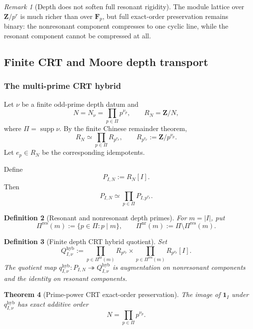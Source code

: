 \documentclass[11pt]{article}
\newtheorem{theorem}{Theorem}[section]
\newtheorem{definition}[theorem]{Definition}
\theoremstyle{remark}
\newtheorem{remark}[theorem]{Remark}
\newcommand{\Z}{\mathbf Z}
\newcommand{\F}{\mathbf F}
\begin{document}
\begin{remark}[Depth does not soften full resonant rigidity]
The module lattice over \(\Z/p^r\) is much richer than over \(\F_p\), but full exact-order preservation remains binary: the nonresonant component compresses to one cyclic line, while the resonant component cannot be compressed at all.
\end{remark}

\subsection{Finite CRT and Moore depth transport}

\subsubsection{The multi-prime CRT hybrid}

Let \(\nu\) be a finite odd-prime depth datum and
\[
 N=N_\nu=\prod_{p\in\Pi}p^{\nu_p},
 \qquad
 R_N=\Z/N,
\]
where \(\Pi=\operatorname{supp}\nu\).  By the finite Chinese remainder theorem,
\[
 \boxed{
 R_N\simeq\prod_{p\in\Pi}R_{p^{\nu_p}},
 \qquad
 R_{p^{\nu_p}}:=\Z/p^{\nu_p}.}
\]
Let \(e_p\in R_N\) be the corresponding idempotents.

Define
\[
 P_{I,N}:=R_N[I].
\]
Then
\[
 P_{I,N}\simeq\prod_{p\in\Pi}P_{I,p^{\nu_p}}.
\]

\begin{definition}[Resonant and nonresonant depth primes]
For \(m=|I|\), put
\[
 \Pi^{\mathrm{res}}(m):=\{p\in\Pi:p\mid m\},
 \qquad
 \Pi^{\mathrm{nr}}(m):=\Pi\setminus\Pi^{\mathrm{res}}(m).
\]
\end{definition}

\begin{definition}[Finite depth CRT hybrid quotient]\label{P1C-def:depth-crt-hybrid}
Set
\[
 \boxed{
 Q_{I,\nu}^{\mathrm{hyb}}
 :=
 \prod_{p\in\Pi^{\mathrm{nr}}(m)}R_{p^{\nu_p}}
 \times
 \prod_{p\in\Pi^{\mathrm{res}}(m)}R_{p^{\nu_p}}[I].}
\]
The quotient map \(q_{I,\nu}^{\mathrm{hyb}}:P_{I,N}\twoheadrightarrow Q_{I,\nu}^{\mathrm{hyb}}\) is augmentation on nonresonant components and the identity on resonant components.
\end{definition}

\begin{theorem}[Prime-power CRT exact-order preservation]\label{P1C-thm:crt-preservation}
The image of \(\mathbf1_I\) under \(q_{I,\nu}^{\mathrm{hyb}}\) has exact additive order
\[
 \boxed{N=\prod_{p\in\Pi}p^{\nu_p}.}
\]
\end{theorem}
\end{document}

